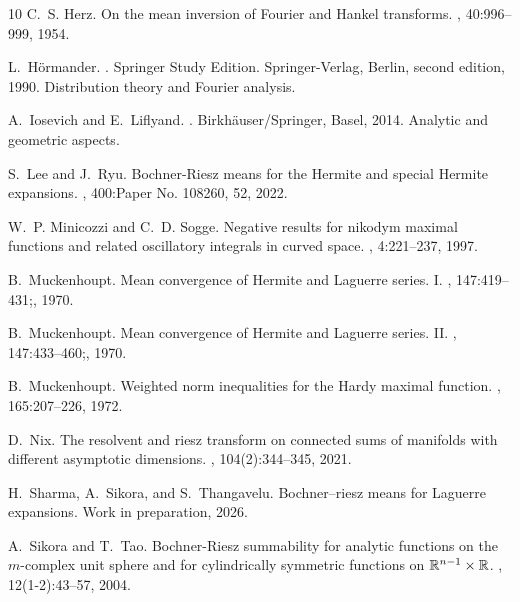 \documentclass[12pt]{amsart}
\begin{document}
\begin{thebibliography}{10}
	C.~S. Herz.
	\newblock On the mean inversion of {F}ourier and {H}ankel transforms.
	, 40:996--999, 1954.
	
	L.~H\"ormander.
	.
	\newblock Springer Study Edition. Springer-Verlag, Berlin, second edition,
	1990.
	\newblock Distribution theory and Fourier analysis.
	
	A.~Iosevich and E.~Liflyand.
	.
	\newblock Birkh\"auser/Springer, Basel, 2014.
	\newblock Analytic and geometric aspects.
	
	S.~Lee and J.~Ryu.
	\newblock Bochner-{R}iesz means for the {H}ermite and special {H}ermite
	expansions.
	, 400:Paper No. 108260, 52, 2022.
	
	W.~P. Minicozzi and C.~D. Sogge.
	\newblock Negative results for nikodym maximal functions and related
	oscillatory integrals in curved space.
	, 4:221--237, 1997.
	
	B.~Muckenhoupt.
	\newblock Mean convergence of {H}ermite and {L}aguerre series. {I}.
	, 147:419--431;, 1970.
	
	B.~Muckenhoupt.
	\newblock Mean convergence of {H}ermite and {L}aguerre series. {II}.
	, 147:433--460;, 1970.
	
	B.~Muckenhoupt.
	\newblock Weighted norm inequalities for the {H}ardy maximal function.
	, 165:207--226, 1972.
	
	D.~Nix.
	\newblock The resolvent and riesz transform on connected sums of manifolds with
	different asymptotic dimensions.
	, 104(2):344--345, 2021.
	
	H.~Sharma, A.~Sikora, and S.~Thangavelu.
	\newblock Bochner--riesz means for {L}aguerre expansions.
	\newblock Work in preparation, 2026.
	
	A.~Sikora and T.~Tao.
	\newblock Bochner-{R}iesz summability for analytic functions on the
	{$m$}-complex unit sphere and for cylindrically symmetric functions on {$\Bbb
		R^{n-1}\times\Bbb R$}.
	, 12(1-2):43--57, 2004.
	

\end{thebibliography}
\end{document}
